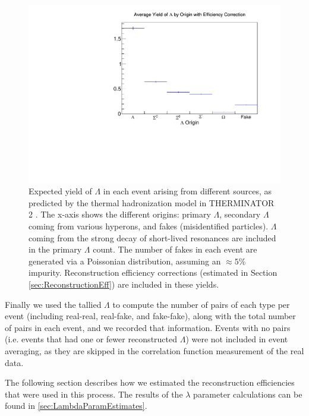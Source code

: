 \begin{figure}[hbt]
\includegraphics[width=36pc]{Figures/YieldAndEff/2016-08-06-LambdaYieldsWithEfficiency.pdf}
\caption[$\Lambda$ yields from THERMINATOR 2 with efficiency corrections]{
Expected yield of $\Lambda$ in each event arising from different sources, as predicted by the thermal hadronization model in THERMINATOR 2 \cite{Chojnacki:2011hb}. The x-axis shows the different origins: primary $\Lambda$, secondary $\Lambda$ coming from various hyperons, and fakes (misidentified particles).  $\Lambda$ coming from the strong decay of short-lived resonances are included in the primary $\Lambda$ count. The number of fakes in each event are generated via a Poissonian distribution, assuming an $\approx 5$\% impurity. Reconstruction efficiency corrections (estimated in Section \ref{sec:ReconstructionEff}) are included in these yields.
}
\label{fig:LambdaYieldsWithEfficiency}
\end{figure}




Finally we used the tallied $\Lambda$ to compute the number of pairs of each type per event (including real-real, real-fake, and fake-fake), along with the total number of pairs in each event, and we recorded that information.
Events with no pairs (i.e. events that had one or fewer reconstructed $\Lambda$) were not included in event averaging, as they are skipped in the correlation function measurement of the real data.



The following section describes how we estimated the reconstruction efficiencies that were used in this process.
The results of the $\lambda$ parameter calculations can be found in \ref{sec:LambdaParamEstimates}.

